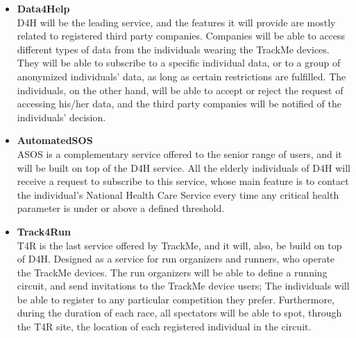 \documentclass[12pt]{article}
\begin{document}
\begin{itemize}
\item{\textbf{Data4Help}}
\\D4H will be the leading service, and the features it will provide are mostly related to registered third party companies. Companies will be able to access different types of data from the individuals wearing the TrackMe devices. They will be able to subscribe to a specific individual data, or to a group of anonymized individuals' data, as long as certain restrictions are fulfilled. The individuals, on the other hand, will be able to accept or reject the request of accessing his/her data, and the third party companies will be notified of the individuals' decision.

\item{\textbf{AutomatedSOS}}
\\ ASOS is a complementary service offered to the senior range of users, and it will be built on top of the D4H service. All the elderly individuals of D4H will receive a request to subscribe to this service, whose main feature is to contact the individual's National Health Care Service every time any critical health parameter is under or above a defined threshold. 

\item{\textbf{Track4Run}}
\\T4R is the last service offered by TrackMe, and it will, also, be build on top of D4H. Designed as a service for run organizers and runners, who operate the TrackMe devices. The run organizers will be able to define a running circuit, and send invitations to the TrackMe device users; The individuals will be able to register to any particular competition they prefer. Furthermore, during the duration of each race, all spectators will be able to spot, through the T4R site, the location of each registered individual in the circuit.
\end{itemize}
\end{document}
